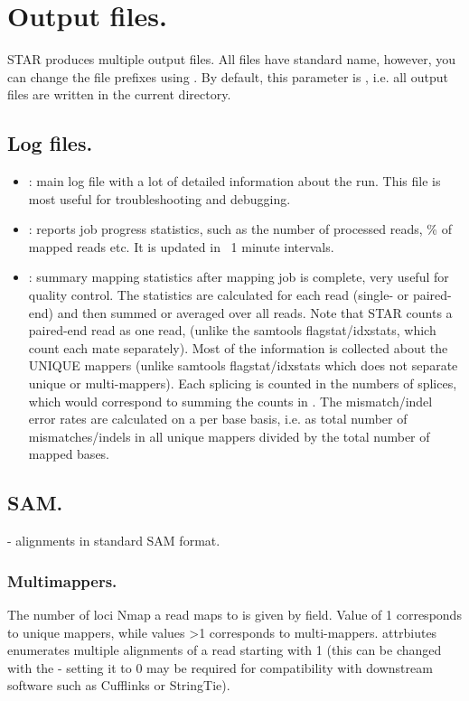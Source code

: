 \documentclass[12pt]{article}
\begin{document}
\section{Output files.}\label{Output_files}
STAR produces multiple output files. All files have standard name, however, you can change the file prefixes using  . By default, this parameter is , i.e. all output files are written in the current directory.
\subsection{Log files.}
\begin{itemize}
\item[]
: main log file with a lot of detailed information about the run. This file is most useful for troubleshooting and debugging.
\item[]
: reports job progress statistics, such as the number of processed reads, \% of mapped reads etc. It is updated in ~1 minute intervals.
\item[]
: summary mapping statistics after mapping job is complete, very useful for quality control. The statistics are calculated for each read (single- or paired-end) and then summed or averaged over all reads. Note that STAR counts a paired-end read as one read, (unlike the samtools flagstat/idxstats, which count each mate separately). Most of the information is collected about the UNIQUE mappers (unlike samtools flagstat/idxstats which does not separate unique or multi-mappers). Each splicing is counted in the numbers of splices, which would correspond to summing the counts in . The mismatch/indel error rates are calculated on a per base basis, i.e. as total number of mismatches/indels in all unique mappers divided by the total number of mapped bases.
\end{itemize}

\subsection{SAM.}
 - alignments in standard SAM format.
\subsubsection{Multimappers.}
The number of loci Nmap a read maps to is given by   field. Value of 1 corresponds to unique mappers, while values \textgreater1 corresponds to multi-mappers.  attrbiutes enumerates multiple alignments of a read starting with 1 (this can be changed with the  - setting it to 0 may be required for compatibility with downstream software such as Cufflinks or StringTie).
\end{document}
